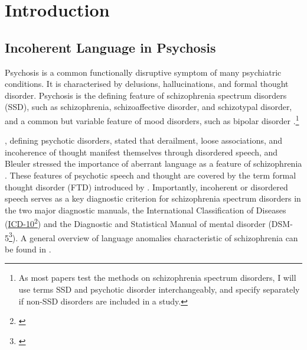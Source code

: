 
\chapter{Introduction} %
\label{chap:1:intro}




\section{Incoherent Language in Psychosis}

Psychosis is a common functionally disruptive symptom of many psychiatric conditions. It is characterised by delusions, hallucinations, and formal thought disorder.  Psychosis is the defining feature of schizophrenia spectrum disorders (SSD), such as schizophrenia, schizoaffective disorder, and schizotypal disorder, and a common but variable feature of mood disorders, such as bipolar disorder \citep{arciniegas2015psychosis}.\footnote{As most papers test the methods on schizophrenia spectrum disorders, I will use terms SSD and psychotic disorder interchangeably, and specify separately if non-SSD disorders are included in a study.}

\citet{kraepelin1919dementia}, defining psychotic disorders, stated that derailment, loose associations, and incoherence of thought manifest themselves through disordered speech, and Bleuler stressed the importance of aberrant language as a feature of schizophrenia \citep{bleuler1911dementia}. These features of psychotic speech and thought are covered by the term formal thought disorder (FTD) introduced by \citet{andreasen1986tlc}. Importantly, incoherent or disordered speech serves as a key diagnostic criterion for schizophrenia spectrum disorders in the two major diagnostic manuals, the International Classification of Diseases (\href{https://icd.who.int/browse10/2016/en#/F20-F29}{ICD-10}\footnote{\cite{world1992icd}}) and the Diagnostic and Statistical Manual of mental disorder (DSM-5\footnote{\cite{american2013dsm}}). A general overview of language anomalies characteristic of schizophrenia can be found in \citet{kuperberg2010language_a, kuperberg2010language_b, de2020anomalies}. 

